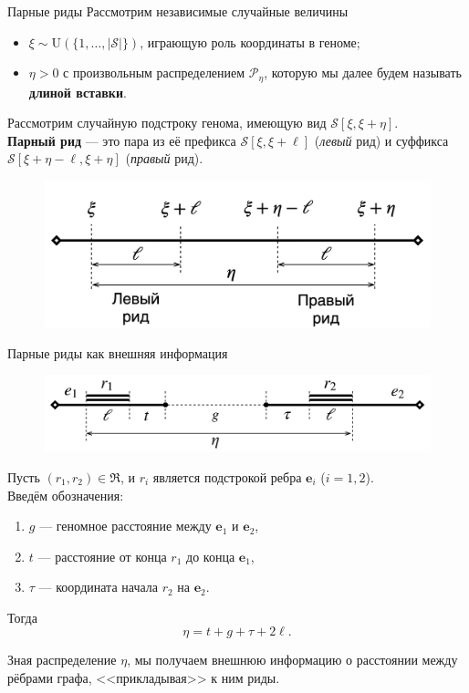 \documentclass[unicode, notheorems]{beamer}
\begin{document}
\begin{frame}{Парные риды}
Рассмотрим независимые случайные величины
\begin{itemize}
	\item $\xi \sim \mathrm{U}(\{ 1, \ldots, |\mathcal{S}|\})$, играющую роль координаты в геноме;
	\item $\eta > 0$ с произвольным распределением $\mathcal{P}_{\eta}$, которую мы далее будем называть \textbf{длиной вставки}.
\end{itemize}

\begin{block}{}
		Рассмотрим случайную подстроку генома, имеющую вид $\mathcal{S}[\xi, \xi+\eta]$.\\
		\medskip
		\textbf{Парный рид} --- это пара из её префикса $\mathcal{S}[\xi, \xi+\ell]$  (\textit{левый} рид) и суффикса $\mathcal{S}[\xi+\eta-\ell, \xi+\eta]$ (\textit{правый} рид).
\end{block}
\begin{figure}
	\includegraphics[scale=0.12]{fig/fragment}
\end{figure}
\end{frame}

\begin{frame}{Парные риды как внешняя информация}
\begin{figure}
	\centering
	\includegraphics[scale=0.2]{img/alignment_shifted}
\end{figure}

Пусть $(r_1, r_2) \in \mathfrak{R}$, и $r_i$ является подстрокой ребра $\mathbf{e}_i$ ($i=1,2$). \\
\medskip
Введём обозначения: 
\begin{enumerate}
	\item $g$ --- геномное расстояние между $\mathbf{e}_1$ и $\mathbf{e}_2$,
	\item $t$ --- расстояние от конца $r_1$ до конца $\mathbf{e}_1$,
	\item $\tau$ --- координата начала $r_2$ на $\mathbf{e}_2$.
\end{enumerate}
Тогда \[ \eta = t + g + \tau + 2\ell. \]

{\color{blue} Зная распределение $\eta$, мы получаем внешнюю информацию о расстоянии между рёбрами графа, <<прикладывая>> к ним риды.}

\end{frame}
\end{document}
